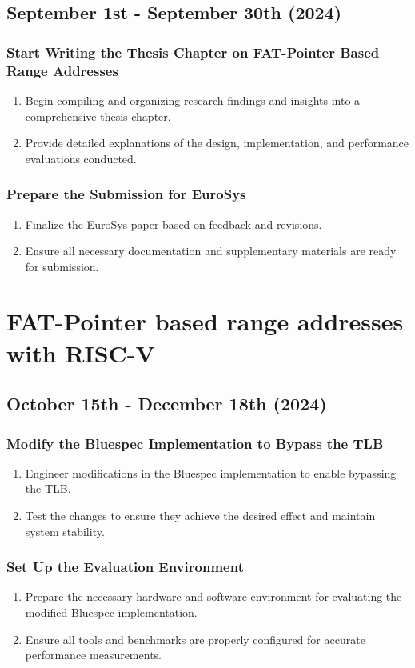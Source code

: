 \subsection{September 1st - September 30th (2024)}
\subsubsection{Start Writing the Thesis Chapter on FAT-Pointer Based Range Addresses}
\begin{enumerate}
    \item Begin compiling and organizing research findings and insights into a comprehensive thesis chapter.
    \item Provide detailed explanations of the design, implementation, and performance evaluations conducted.
\end{enumerate}
\subsubsection{Prepare the Submission for EuroSys}
\begin{enumerate}
    \item Finalize the EuroSys paper based on feedback and revisions.
    \item Ensure all necessary documentation and supplementary materials are ready for submission.
\end{enumerate}

\section{FAT-Pointer based range addresses with RISC-V}
\subsection{October 15th - December 18th (2024)}
\subsubsection{Modify the Bluespec Implementation to Bypass the TLB}
\begin{enumerate}
    \item Engineer modifications in the Bluespec implementation to enable bypassing the TLB.
    \item Test the changes to ensure they achieve the desired effect and maintain system stability.
\end{enumerate}
\subsubsection{Set Up the Evaluation Environment}
\begin{enumerate}
    \item Prepare the necessary hardware and software environment for evaluating the modified Bluespec implementation.
    \item Ensure all tools and benchmarks are properly configured for accurate performance measurements.
\end{enumerate}

